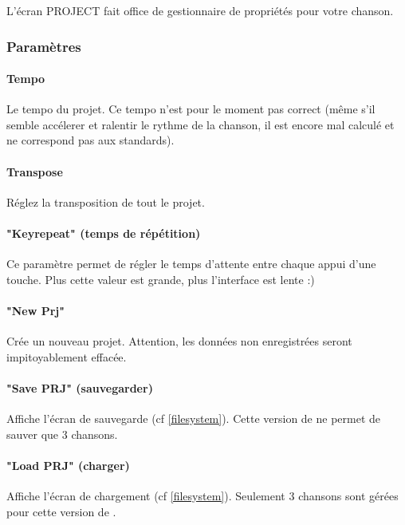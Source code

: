 \documentclass[12pt,a4paper]{article}
\begin{document}
    L'écran PROJECT fait office de gestionnaire de propriétés pour votre chanson. 
    

        \subsubsection{Paramètres}
        
        \paragraph{Tempo} Le tempo du projet. Ce tempo n'est pour le moment pas correct (même s'il semble accélerer et ralentir le rythme de la chanson, il est encore mal calculé et ne correspond pas aux standards).

        \paragraph{Transpose} Réglez la transposition de tout le projet.

        
        \paragraph{"Keyrepeat" (temps de répétition)} Ce paramètre permet de régler le temps d'attente entre chaque appui d'une touche. Plus cette valeur est grande, plus l'interface est lente :)

        \paragraph{"New Prj"} Crée un nouveau projet. Attention, les données non enregistrées seront impitoyablement effacée. 
        
        \paragraph{"Save PRJ" (sauvegarder)}  Affiche l'écran de sauvegarde (cf \ref{filesystem}). Cette version de \FAT ne permet de sauver que 3 chansons.
        
        \paragraph{"Load PRJ" (charger)} Affiche l'écran de chargement (cf \ref{filesystem}). Seulement 3 chansons sont gérées pour cette version de \FAT.
    
\end{document}
